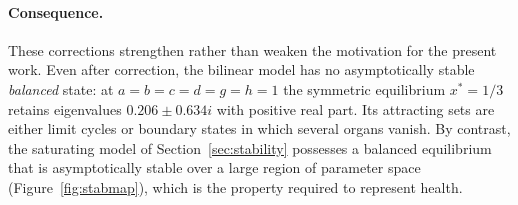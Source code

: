 \documentclass{article}
\begin{document}
\paragraph{Consequence.}
These corrections strengthen rather than weaken the motivation for the present
work. Even after correction, the bilinear model has no asymptotically stable
\emph{balanced} state: at $a=b=c=d=g=h=1$ the symmetric equilibrium $x^\ast=1/3$
retains eigenvalues $0.206\pm0.634i$ with positive real part. Its attracting sets
are either limit cycles or boundary states in which several organs vanish. By
contrast, the saturating model of Section~\ref{sec:stability} possesses a balanced
equilibrium that is asymptotically stable over a large region of parameter space
(Figure~\ref{fig:stabmap}), which is the property required to represent health.









































\printbibliography
\end{document}
